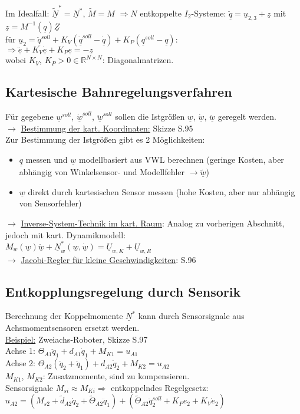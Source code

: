 \documentclass[a4paper,landscape,6pt]{article}
\newcommand{\ul}[1]{\underline{#1}}
\begin{document}
\begin{multicols}{3}
Im Idealfall: $\tilde{\ul N}^* = \ul N^*$, $\tilde M = M$ $\Rightarrow N$ entkoppelte $I_2$-Systeme:
$ \ddot{\ul q} = \ul u_{2,3} + \ul z$ mit $\ul z = M^{-1}(\ul q) \ul Z$\\
für $\ul u_2 = \ddot {\ul q}^{soll} + K_V (\dot{\ul q}^{soll} - \dot{\ul q}) + K_P ({\ul q}^{soll} - {\ul q})$:\\
$\Rightarrow \ddot{\ul e} + K_V \dot{\ul e} + K_P{\ul e} = - \ul z$\\
wobei $K_V$, $K_P > 0 \in \mathbb{R}^{N\times N}$: Diagonalmatrizen.
\subsection*{Kartesische Bahnregelungsverfahren}
Für gegebene $\ul w^{soll}$, $\dot{\ul{w}}^{soll}$, $\ddot{\ul{w}}^{soll}$ sollen die Istgrößen $\ul w$, $\dot{\ul{w}}$, $\ddot{\ul{w}}$ geregelt werden.\\

$\rightarrow$ \ul{Bestimmung der kart. Koordinaten:} Skizze S.95\\
Zur Bestimmung der Istgrößen gibt es 2 Möglichkeiten:
\begin{itemize}
\item $\ul q$ messen und $\ul w$ modellbasiert aus VWL berechnen (geringe Kosten, aber abhängig von Winkelsensor- und Modellfehler $\rightarrow \tilde{\ul w}$)
\item $\ul w$ direkt durch kartesischen Sensor messen (hohe Kosten, aber nur abhängig von Sensorfehler)
\end{itemize}
$\rightarrow$ \ul{Inverse-System-Technik im kart. Raum}:
Analog zu vorherigen Abschnitt, jedoch mit kart. Dynamikmodell:\\
$M_w(\ul w)\ul{\ddot w} + \ul N_w^* (\ul w, \ul{\dot w}) = \ul U_{w,K} + \ul U_{w,R}$\\

$\rightarrow$ \ul{Jacobi-Regler für kleine Geschwindigkeiten}: S.96\\

\subsection*{Entkopplungsregelung durch Sensorik}
Berechnung der Koppelmomente ${\ul N}^*$ kann durch Sensorsignale aus Achsmomentsensoren ersetzt werden.\\
\ul{Beispiel:} Zweiachs-Roboter, Skizze S.97\\
Achse 1: $\Theta_{A1} \ddot q_1 + d_{A1} \dot q_1 + M_{K1} = u_{A1}$\\
Achse 2: $\Theta_{A2} (\ddot q_2 + \ddot q_1) + d_{A2} \dot q_2 + M_{K2} = u_{A2}$\\
$M_{K1}$, $M_{K2}$: Zusatzmomente, sind zu kompensieren.\\
Sensorsignale $M_{si} \approx M_{Ki} \Rightarrow$ entkoppelndes Regelgesetz:\\
$u_{A2} = (M_{s2} + \tilde d_{A2} \dot q_2 + \tilde \Theta_{A2}\ddot q_1) + (\tilde \Theta_{A2}\ddot q_2^{soll} + K_P e_2 + K_V \dot e_2)$\\


\end{multicols}
\end{document}
